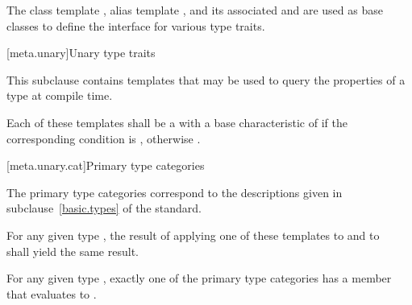%
%
%
%
\pnum
The class template ,
alias template , and
its associated 
 and 
are used as base classes to define
the interface for various type traits.

[meta.unary]{Unary type traits}

\pnum
This subclause contains templates that may be used to query the
properties of a type at compile time.

\pnum
Each of these templates shall be a
with a base characteristic of
 if the corresponding condition is , otherwise
.

[meta.unary.cat]{Primary type categories}

\pnum
The primary type categories correspond to the descriptions given in
subclause~\ref{basic.types} of the \Cpp{} standard.

\pnum
For any given type , the result of applying one of these templates to
 and to \cv{}~ shall yield the same result.

\pnum
\begin{note}
For any given type , exactly one of the primary type categories
has a  member that evaluates to .
\end{note}

